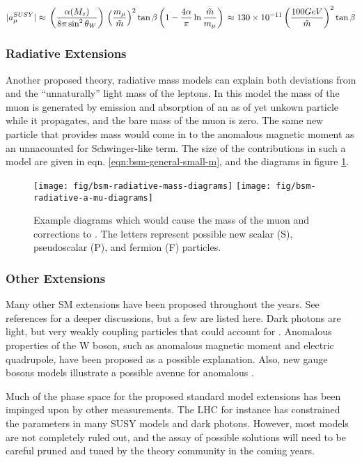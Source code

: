 \begin{equation}
\label{eqn:bsm-a-mu-susy}
|a_\mu^{SUSY}| \approx \\
\left(\frac{\alpha(M_z)}{8 \pi \sin^2{\theta_W}} \right) \\
\left( \frac{m_\mu}{\tilde{m}} \right)^2 \tan{\beta} \\
\left(1 - \frac{4\alpha}{\pi}\ln{\frac{\tilde{m}}{m_\mu}} \right) \\
\approx 130 \times 10^{-11} \\
\left(\frac{100 GeV}{\tilde{m}} \right)^2 \tan{\beta}
\end{equation}

\subsubsection{Radiative Extensions}
Another proposed theory, radiative mass models can explain both deviations from \gmtwo and the ``unnaturally'' light mass of the leptons.  In this model the mass of the muon is generated by emission and absorption of an as of yet unkown particle while it propagates, and the bare mass of the muon is zero.  The same new particle that provides mass would come in to the anomalous magnetic moment as an unnacounted for Schwinger-like term.  The size of the contributions in such a model are given in eqn. \ref{eqn:bsm-general-small-m}, and the diagrams in figure \ref{fig:bsm-radiative-diagrams}\cite{a-mu-harbinger}.

\begin{figure}
\label{fig:bsm-radiative-diagrams}
\centering
\texttt{[image: fig/bsm-radiative-mass-diagrams]}
\texttt{[image: fig/bsm-radiative-a-mu-diagrams]}
\caption{Example diagrams which would cause the mass of the muon and corrections to \mugmtwo.  The letters represent possible new scalar (S), pseudoscalar (P), and fermion (F) particles.}
\end{figure}

\subsubsection{Other Extensions}

Many other SM extensions have been proposed throughout the years.  See references \cite{a-mu-harbinger, the-muon-g-2, e989-tdr} for a deeper discussions, but a few are listed here.  Dark photons are light, but very weakly coupling particles that could account for \mugmtwo.  Anomalous properties of the W boson, such as anomalous magnetic moment and electric quadrupole, have been proposed as a possible explanation.  Also, new gauge bosons models illustrate a possible avenue for anomalous \gmtwo.

Much of the phase space for the proposed standard model extensions has been impinged upon by other measurements.  The LHC for instance has constrained the parameters in many SUSY models and dark photons.  However, most models are not completely ruled out, and the assay of possible solutions will need to be careful pruned and tuned by the theory community in the coming years.
